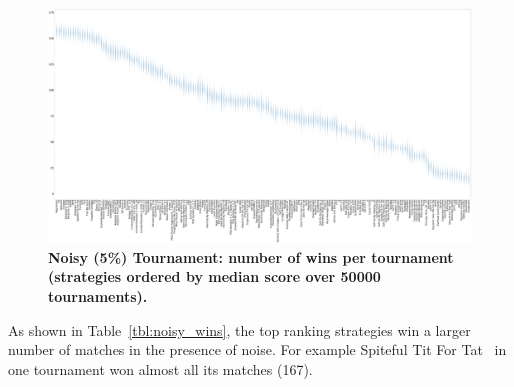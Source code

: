 \documentclass[10pt,letterpaper]{article}
\begin{document}
\begin{landscape}
    \begin{figure}[!hbtp]
        \centering
        \includegraphics[width=\paperwidth]{noisy_wins_boxplots.pdf}
        \caption{\bf Noisy (5\%) Tournament: number of wins per tournament
            (strategies ordered by median score over 50000 tournaments).}
        \label{fig:noisy_winplot}
    \end{figure}
\end{landscape}

As shown in Table~\ref{tbl:noisy_wins}, the top ranking strategies win a larger
number of matches in the presence of noise. For example Spiteful Tit For Tat~\cite{Prison1998}
in one tournament won almost all its matches (167).
\end{document}
